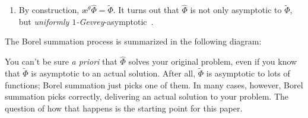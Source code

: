 \documentclass{article}
\newcommand{\series}[1]{\tilde{#1}}
\newcommand{\laplace}{\mathcal{L}}
\newcommand{\borel}{\mathcal{B}}
\newcommand{\aexp}{\text{\ae}}
\theoremstyle{definition}
\theoremstyle{plain}
\begin{document}
\begin{enumerate}[start=4]
\item By construction, $\aexp^\theta \hat{\Phi} = \series{\Phi}$. It turns out that $\hat{\Phi}$ is not only asymptotic to $\series{\Phi}$, but {\em {uniformly} $1$-Gevrey}-asymptotic~\cite[Corollary~5.23]{diverg-resurg-i}.
\end{enumerate}

The Borel summation process is summarized in the following diagram:
\begin{center}
\end{center}

You can't be sure {\em a priori} that $\hat{\Phi}$ solves your original problem, even if you know that $\series{\Phi}$ is asymptotic to an actual solution. After all, $\series{\Phi}$ is asymptotic to lots of functions; Borel summation just picks one of them. In many cases, however, Borel summation picks correctly, delivering an actual solution to your problem. The question of how that happens is the starting point for this paper.
\end{document}
